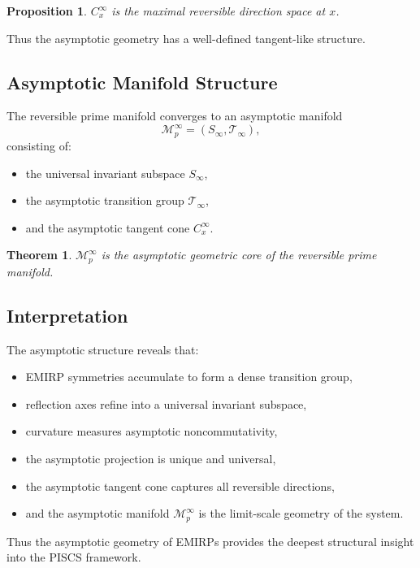 \documentclass[11pt]{article}
\theoremstyle{definition}
\theoremstyle{plain}
\newtheorem{theorem}[definition]{Theorem}
\newtheorem{proposition}[definition]{Proposition}
\theoremstyle{remark}
\begin{document}
\begin{proposition}
$C_x^\infty$ is the maximal reversible direction space at $x$.
\end{proposition}

Thus the asymptotic geometry has a well-defined tangent-like structure.

\subsection{Asymptotic Manifold Structure}

The reversible prime manifold converges to an asymptotic manifold
\[
\mathcal{M}_p^\infty = (S_\infty, \mathcal{T}_\infty),
\]
consisting of:

\begin{itemize}
    \item the universal invariant subspace $S_\infty$,
    \item the asymptotic transition group $\mathcal{T}_\infty$,
    \item and the asymptotic tangent cone $C_x^\infty$.
\end{itemize}

\begin{theorem}
$\mathcal{M}_p^\infty$ is the asymptotic geometric core of the reversible
prime manifold.
\end{theorem}

\subsection{Interpretation}

The asymptotic structure reveals that:

\begin{itemize}
    \item EMIRP symmetries accumulate to form a dense transition group,
    \item reflection axes refine into a universal invariant subspace,
    \item curvature measures asymptotic noncommutativity,
    \item the asymptotic projection is unique and universal,
    \item the asymptotic tangent cone captures all reversible directions,
    \item and the asymptotic manifold $\mathcal{M}_p^\infty$ is the
    limit-scale geometry of the system.
\end{itemize}

Thus the asymptotic geometry of EMIRPs provides the deepest structural
insight into the PISCS framework.
\end{document}
